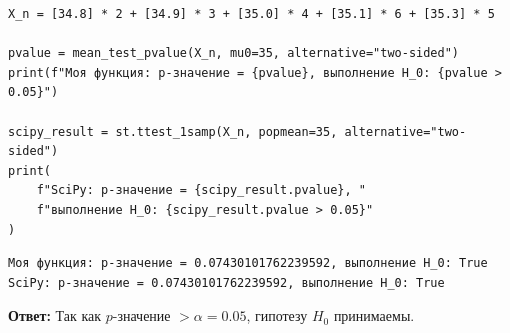 \documentclass[a4paper,14pt]{extarticle}
\begin{document}

\begin{lstlisting}
X_n = [34.8] * 2 + [34.9] * 3 + [35.0] * 4 + [35.1] * 6 + [35.3] * 5

pvalue = mean_test_pvalue(X_n, mu0=35, alternative="two-sided")
print(f"Моя функция: p-значение = {pvalue}, выполнение H_0: {pvalue > 0.05}")

scipy_result = st.ttest_1samp(X_n, popmean=35, alternative="two-sided")
print(
    f"SciPy: p-значение = {scipy_result.pvalue}, "
    f"выполнение H_0: {scipy_result.pvalue > 0.05}"
)
\end{lstlisting}


\begin{lstlisting}
Моя функция: p-значение = 0.07430101762239592, выполнение H_0: True
SciPy: p-значение = 0.07430101762239592, выполнение H_0: True
\end{lstlisting}

\textbf{Ответ:} Так как \(p\)-значение \(> \alpha = 0.05\), гипотезу \(H_0\) принимаемы.






\end{document}
